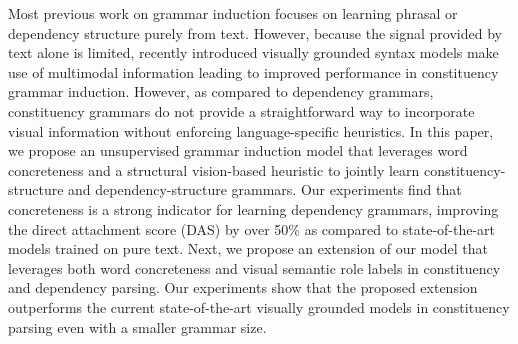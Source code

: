 Most previous work on grammar induction focuses on learning phrasal or dependency structure purely from text. However, because the signal provided by text alone is limited, recently introduced visually grounded syntax models make use of multimodal information leading to improved performance in constituency grammar induction. However, as compared to dependency grammars, constituency grammars do not provide a straightforward way to incorporate visual information without enforcing language-specific heuristics. In this paper, we propose an unsupervised grammar induction model that leverages word concreteness and a structural vision-based heuristic to jointly learn constituency-structure and dependency-structure grammars. Our experiments find that concreteness is a strong indicator for learning dependency grammars, improving the direct attachment score (DAS) by over 50\% as compared to state-of-the-art models trained on pure text. Next, we propose an extension of our model that leverages both word concreteness and visual semantic role labels in constituency and dependency parsing. Our experiments show that the proposed extension outperforms the current state-of-the-art visually grounded models in constituency parsing even with a smaller grammar size.
